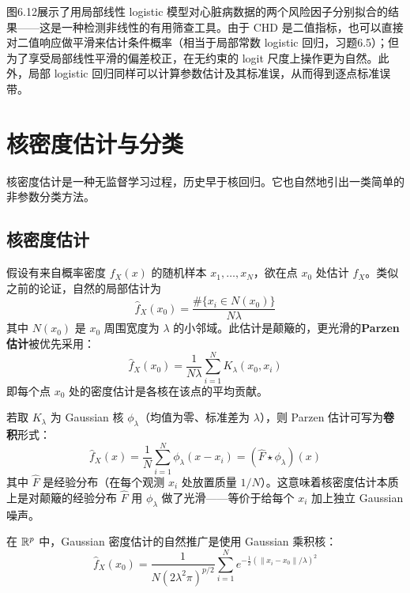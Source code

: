 图6.12展示了用局部线性 logistic 模型对心脏病数据的两个风险因子分别拟合的结果——这是一种检测非线性的有用筛查工具。由于 CHD 是二值指标，也可以直接对二值响应做平滑来估计条件概率（相当于局部常数 logistic 回归，习题6.5）；但为了享受局部线性平滑的偏差校正，在无约束的 logit 尺度上操作更为自然。此外，局部 logistic 回归同样可以计算参数估计及其标准误，从而得到逐点标准误带。

\section{核密度估计与分类}

核密度估计是一种无监督学习过程，历史早于核回归。它也自然地引出一类简单的非参数分类方法。

\subsection{核密度估计}

假设有来自概率密度 $f_X(x)$ 的随机样本 $x_1, \ldots, x_N$，欲在点 $x_0$ 处估计 $f_X$。类似之前的论证，自然的局部估计为
\begin{equation}\label{eq:local_density}
    \hat{f}_X(x_0) = \frac{\#\{x_i \in N(x_0)\}}{N \lambda}
\end{equation}
其中 $N(x_0)$ 是 $x_0$ 周围宽度为 $\lambda$ 的小邻域。此估计是颠簸的，更光滑的\textbf{Parzen 估计}被优先采用：
\begin{equation}\label{eq:parzen}
    \hat{f}_X(x_0) = \frac{1}{N \lambda} \sum_{i=1}^{N} K_\lambda(x_0, x_i)
\end{equation}
即每个点 $x_0$ 处的密度估计是各核在该点的平均贡献。

若取 $K_\lambda$ 为 Gaussian 核 $\phi_\lambda$（均值为零、标准差为 $\lambda$），则 Parzen 估计可写为\textbf{卷积}形式：
\begin{equation}\label{eq:parzen_conv}
    \hat{f}_X(x) = \frac{1}{N} \sum_{i=1}^{N} \phi_\lambda(x - x_i) = (\hat{F} \star \phi_\lambda)(x)
\end{equation}
其中 $\hat{F}$ 是经验分布（在每个观测 $x_i$ 处放置质量 $1/N$）。这意味着核密度估计本质上是对颠簸的经验分布 $\hat{F}$ 用 $\phi_\lambda$ 做了光滑——等价于给每个 $x_i$ 加上独立 Gaussian 噪声。

在 $\mathbb{R}^p$ 中，Gaussian 密度估计的自然推广是使用 Gaussian 乘积核：
\begin{equation}\label{eq:gaussian_product}
    \hat{f}_X(x_0) = \frac{1}{N (2\lambda^2 \pi)^{p/2}} \sum_{i=1}^{N} e^{-\frac{1}{2} (\|x_i - x_0\| / \lambda)^2}
\end{equation}

